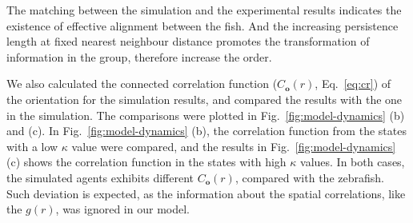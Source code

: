 \documentclass[11pt,twoside]{report}
\begin{document}
The matching between the simulation and the experimental results indicates the existence of effective alignment between the fish. And the increasing persistence length at fixed nearest neighbour distance promotes the transformation of information in the group, therefore increase the order. 

We also calculated the connected correlation function ($C_\mathbf{o}(r)$, Eq.~\ref{eq:cr}) of the orientation for the simulation results, and compared the results with the one in the simulation. The comparisons were plotted in Fig.~\ref{fig:model-dynamics} (b) and (c). In Fig.~\ref{fig:model-dynamics} (b), the correlation function from the states with a low $\kappa$ value were compared, and the results in Fig.~\ref{fig:model-dynamics} (c) shows the correlation function in the states with high $\kappa$ values. In both cases, the simulated agents exhibits different $C_\mathbf{o}(r)$, compared with the zebrafish. Such deviation is expected, as the information about the spatial correlations, like the $g(r)$, was ignored in our model.
\end{document}
